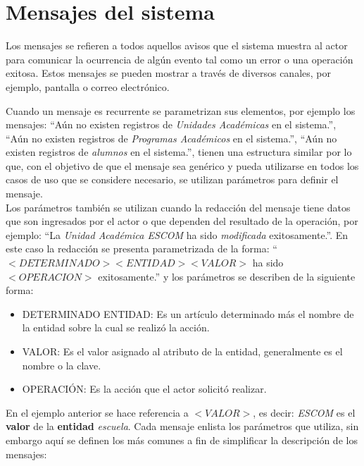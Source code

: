 \chapter{Mensajes del sistema}
\label{ch:mensajes}

Los mensajes se refieren a todos aquellos avisos que el sistema muestra al actor para comunicar la ocurrencia de algún evento tal como un error o una operación exitosa. Estos mensajes se pueden mostrar a través de diversos canales, por ejemplo, pantalla o correo electrónico.


Cuando un mensaje es recurrente se parametrizan sus elementos, por ejemplo los mensajes: ``Aún no existen registros de \textit{Unidades Académicas} en el sistema.'', ``Aún no existen registros de \textit{Programas Académicos} en el sistema.'', 
``Aún no existen registros de \textit{alumnos} en el sistema.'', tienen una estructura similar 
por lo que, con el objetivo de que el mensaje sea genérico y pueda utilizarse en todos los casos de uso que se considere necesario, se utilizan parámetros para definir el mensaje.\\

Los parámetros también se utilizan cuando la redacción del mensaje tiene datos que son ingresados por el actor o que dependen del resultado de la operación, por ejemplo: 
``La \textit{Unidad Académica ESCOM} ha sido \textit{modificada} exitosamente.''. En este caso la redacción se presenta parametrizada de la forma: ``$<DETERMINADO> <ENTIDAD> <VALOR>$ ha sido $<OPERACION>$ exitosamente.'' y los parámetros se describen de la siguiente forma:

\begin{itemize}
	\item DETERMINADO ENTIDAD: Es un artículo determinado más el nombre de la entidad sobre la cual se realizó la acción.
	\item VALOR: Es el valor asignado al atributo de la entidad, generalmente es el nombre o la clave.
	\item OPERACIÓN: Es la acción que el actor solicitó realizar.
\end{itemize}

En el ejemplo anterior se hace referencia a $<VALOR>$, es decir: \textit{ESCOM} es el \textbf{valor} de la \textbf{entidad} \textit{escuela}. Cada mensaje enlista los parámetros  que utiliza, sin embargo aquí se definen los más comunes a fin de simplificar la descripción de los mensajes:

